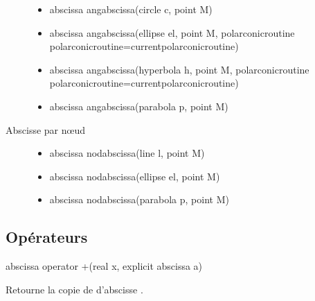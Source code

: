 \documentclass[pdftex]{article}
\begin{document}
\begin{description}
  \begin{itemize}
  \item {}
    \begin{Vcolor}
      abscissa angabscissa(circle c, point M)
    \end{Vcolor}
  \item {}
    \begin{Vcolor}
      abscissa angabscissa(ellipse el, point M, polarconicroutine
      polarconicroutine=currentpolarconicroutine)
    \end{Vcolor}
  \item {}
    \begin{Vcolor}
      abscissa angabscissa(hyperbola h, point M, polarconicroutine
      polarconicroutine=currentpolarconicroutine)
    \end{Vcolor}
  \item {}
    \begin{Vcolor}
      abscissa angabscissa(parabola p, point M)
    \end{Vcolor}
  \end{itemize}
\item[\og{}Abscisse par n\oe{}ud\fg{}]\hspace*{0mm}
  \begin{itemize}
  \item {}
    \begin{Vcolor}
      abscissa nodabscissa(line l, point M)
    \end{Vcolor}
  \item {}
    \begin{Vcolor}
      abscissa nodabscissa(ellipse el, point M)
    \end{Vcolor}
  \item {}
    \begin{Vcolor}
      abscissa nodabscissa(parabola p, point M)
    \end{Vcolor}
  \end{itemize}
\end{description}

\subsection{Opérateurs}
\begin{Vcolor}
  abscissa operator +(real x, explicit abscissa a)
\end{Vcolor}
Retourne la copie de  d'abscisse .
\end{document}
